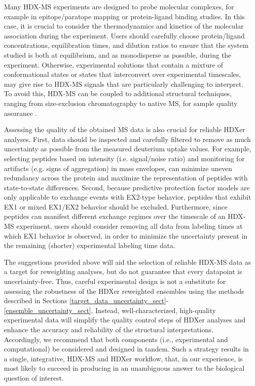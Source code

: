 \documentclass[9pt,tutorial,ASAPversion]{livecoms}
\begin{document}
Many HDX-MS experiments are designed to probe molecular complexes, for example in epitope/paratope mapping or protein-ligand binding studies.
In this case, it is crucial to consider the thermodynamics and kinetics of the molecular association during the experiment.
Users should carefully choose protein/ligand concentrations, equilibration times, and dilution ratios to ensure that the system studied is both at equilibrium, and as monodisperse as possible, during the experiment.
Otherwise, experimental solutions that contain a mixture of conformational states or states that interconvert over experimental timescales, may give rise to HDX-MS signals that are particularly challenging to interpret.
To avoid this, HDX-MS can be coupled to additional structural techniques, ranging from size-exclusion chromatography to native MS, for sample quality assurance \cite{Masson2019,OBrien2018}.

Assessing the quality of the obtained MS data is also crucial for reliable HDXer analyses.
First, data should be inspected and carefully filtered to remove as much uncertainty as possible from the measured deuterium uptake values.
For example, selecting peptides based on intensity (i.e. signal/noise ratio) and monitoring for artifacts (e.g. signs of aggregation) in mass envelopes, can minimize uneven redundancy across the protein and maximize the representation of peptides with state-to-state differences.
Second, because predictive protection factor models are only applicable to exchange events with EX2-type behavior, peptides that exhibit EX1 or mixed EX1/EX2 behavior should be excluded.
Furthermore, since peptides can manifest different exchange regimes over the timescale of an HDX-MS experiment, users should consider removing all data from labeling times at which EX1 behavior is observed, in order to minimize the uncertainty present in the remaining (shorter) experimental labeling time data.

The suggestions provided above will aid the selection of reliable HDX-MS data as a target for reweighting analyses, but do not guarantee that every datapoint is uncertainty-free.
Thus, careful experimental design is not a substitute for assessing the robustness of the HDXer reweighted ensembles using the methods described in Sections \ref{target_data_uncertainty_sect}-\ref{ensemble_uncertainty_sect}.
Instead, well-characterized, high-quality experimental data will simplify the quality control steps of HDXer analyses and enhance the accuracy and reliability of the structural interpretations.
Accordingly, we recommend that both components (i.e., experimental and computational) be considered and designed in tandem.
Such a strategy results in a single, integrative, HDX-MS and HDXer workflow, that, in our experience, is most likely to succeed in producing in an unambiguous answer to the biological question of interest.
\end{document}
